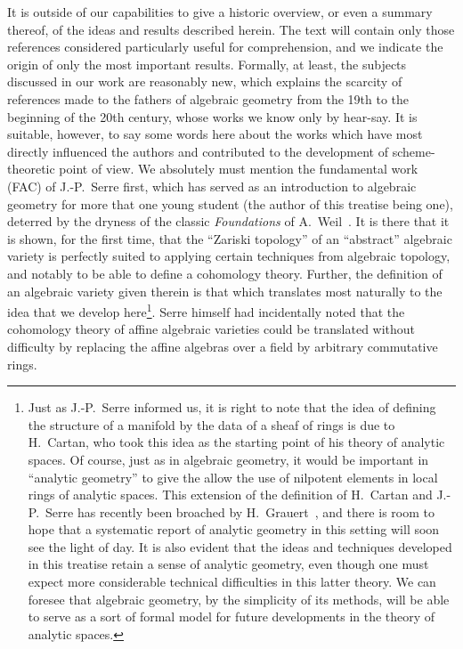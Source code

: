 It is outside of our capabilities to give a historic overview, or even a summary thereof, of the ideas and results described herein.
The text will contain only those references considered particularly useful for comprehension, and we indicate the origin of only the most important results.
Formally, at least, the subjects discussed in our work are reasonably new, which explains the scarcity of references made to the fathers of algebraic geometry from the 19th to the beginning of the 20th century, whose works we know only by hear-say.
It is suitable, however, to say some words here about the works which have most directly influenced the authors and contributed to the development of scheme-theoretic point of view.
We absolutely must mention the fundamental work (FAC) of J.-P.~Serre first, which has served as an introduction to algebraic geometry for more that one young student (the author of this treatise being one), deterred by the dryness of the classic \emph{Foundations} of A.~Weil~\cite{I-18}.
It is there that it is shown, for the first time, that the ``Zariski topology'' of an ``abstract'' algebraic variety is perfectly suited to applying certain techniques from algebraic topology, and notably to be able to define a cohomology theory.
Further, the definition of an algebraic variety given therein is that which translates most naturally to the idea that we develop here\footnote{Just as J.-P.~Serre informed us, it is right to note that the idea of defining the structure of a manifold by the data of a sheaf of rings is due to H.~Cartan, who took this idea as the starting point of his theory of analytic spaces.
Of course, just as in algebraic geometry, it would be important in ``analytic geometry'' to give the allow the use of nilpotent elements in local rings of analytic spaces.
This extension of the definition of H.~Cartan and J.-P.~Serre has recently been broached by H.~Grauert~\cite{I-5}, and there is room to hope that a systematic report of analytic geometry in this setting will soon see the light of day.
It is also evident that the ideas and techniques developed in this treatise retain a sense of analytic geometry, even though one must expect more considerable technical difficulties in this latter theory.
We can foresee that algebraic geometry, by the simplicity of its methods, will be able to serve as a sort of formal model for future developments in the theory of analytic spaces.}.
Serre himself had incidentally noted that the cohomology theory of affine algebraic varieties could be translated without difficulty by replacing the affine algebras over a field by arbitrary commutative rings.
